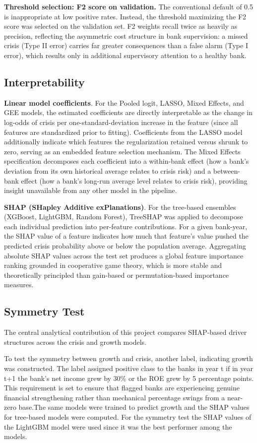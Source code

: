 \documentclass[conference]{IEEEtran}
\begin{document}
\textbf{Threshold selection: F2 score on validation.} The conventional default of 0.5 is inappropriate at low positive rates. Instead, the threshold maximizing the F2 score was selected on the validation set. F2 weights recall twice as heavily as precision, reflecting the asymmetric cost structure in bank supervision: a missed crisis (Type II error) carries far greater consequences than a false alarm (Type I error), which results only in additional supervisory attention to a healthy bank.

\subsection{Interpretability}
\textbf{Linear model coefficients}. For the Pooled logit, LASSO, Mixed Effects, and GEE models, the estimated coefficients are directly interpretable as the change in log-odds of crisis per one-standard-deviation increase in the feature (since all features are standardized prior to fitting). Coefficients from the LASSO model additionally indicate which features the regularization retained versus shrunk to zero, serving as an embedded feature selection mechanism. The Mixed Effects specification decomposes each coefficient into a within-bank effect (how a bank's deviation from its own historical average relates to crisis risk) and a between-bank effect (how a bank's long-run average level relates to crisis risk), providing insight unavailable from any other model in the pipeline.

\textbf{SHAP (SHapley Additive exPlanations)}. For the tree-based ensembles (XGBoost, LightGBM, Random Forest), TreeSHAP \cite{b11} was applied to decompose each individual prediction into per-feature contributions. For a given bank-year, the SHAP value of a feature indicates how much that feature's value pushed the predicted crisis probability above or below the population average. Aggregating absolute SHAP values across the test set produces a global feature importance ranking grounded in cooperative game theory, which is more stable and theoretically principled than gain-based or permutation-based importance measures. 

\subsection{Symmetry Test}
The central analytical contribution of this project compares SHAP-based driver structures across the crisis and growth models. 

To test the symmetry between growth and crisis, another label, indicating growth was constructed. The label assigned positive class to the banks in year t if in year t+1 the bank's net income grew by 30\% or the ROE grew by 5 percentage points. This requirement is set to ensure that flagged banks are experiencing genuine financial strengthening rather than mechanical percentage swings from a near-zero base.The same models were trained to predict growth and the SHAP values for tree-based models were computed. For the symmetry test the SHAP values of the LightGBM model were used since it was the best performer among the models.
\end{document}
